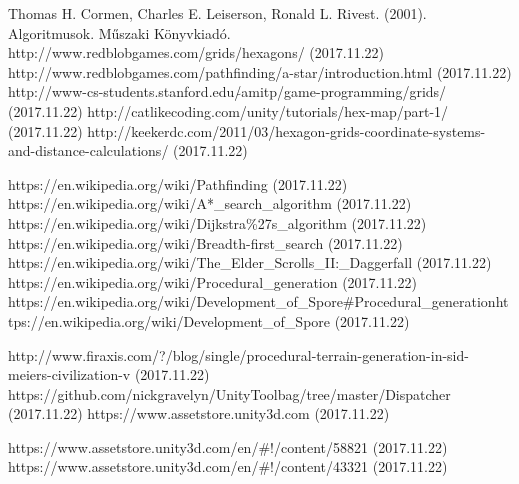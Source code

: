 \begin{thebibliography}{x}
 Thomas H. Cormen, Charles E. Leiserson, Ronald L. Rivest. (2001). Algoritmusok. Műszaki Könyvkiadó.
 http://www.redblobgames.com/grids/hexagons/ (2017.11.22)
 http://www.redblobgames.com/pathfinding/a-star/introduction.html (2017.11.22)
 http://www-cs-students.stanford.edu/$\tilde{}$amitp/game-programming/grids/ (2017.11.22)
 http://catlikecoding.com/unity/tutorials/hex-map/part-1/ (2017.11.22)
 http://keekerdc.com/2011/03/hexagon-grids-coordinate-systems-and-distance-calculations/ (2017.11.22)



 https://en.wikipedia.org/wiki/Pathfinding (2017.11.22)
 https://en.wikipedia.org/wiki/A*\_search\_algorithm (2017.11.22)
 https://en.wikipedia.org/wiki/Dijkstra\%27s\_algorithm (2017.11.22)
 https://en.wikipedia.org/wiki/Breadth-first\_search (2017.11.22)
 https://en.wikipedia.org/wiki/The\_Elder\_Scrolls\_II:\_Daggerfall (2017.11.22)
 https://en.wikipedia.org/wiki/Procedural\_generation (2017.11.22)
 https://en.wikipedia.org/wiki/Development\_of\_Spore\#Procedural\_generationhttps://en.wikipedia.org/wiki/Development\_of\_Spore (2017.11.22)



 http://www.firaxis.com/?/blog/single/procedural-terrain-generation-in-sid-meiers-civilization-v (2017.11.22)
 https://github.com/nickgravelyn/UnityToolbag/tree/master/Dispatcher (2017.11.22)
 https://www.assetstore.unity3d.com (2017.11.22)

 https://www.assetstore.unity3d.com/en/\#!/content/58821 (2017.11.22)
 https://www.assetstore.unity3d.com/en/\#!/content/43321 (2017.11.22)

\end{thebibliography}
